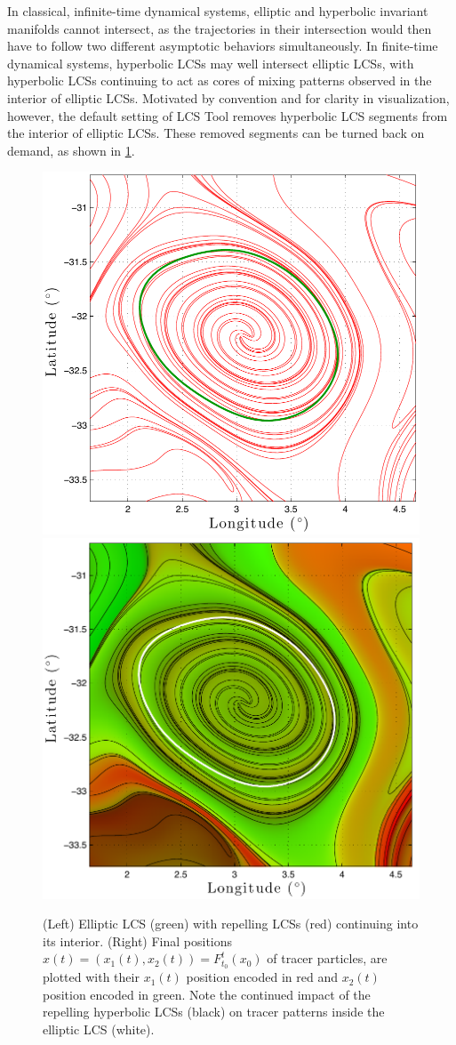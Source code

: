 \documentclass{elsarticle}
\begin{document}
In classical, infinite-time dynamical systems, elliptic and hyperbolic invariant manifolds cannot intersect, as the trajectories in their intersection would then have to follow two different asymptotic behaviors simultaneously. In finite-time dynamical systems, hyperbolic LCSs may well intersect elliptic LCSs, with hyperbolic LCSs continuing to act as cores of mixing patterns observed in the interior of elliptic LCSs. Motivated by convention and for clarity in visualization, however, the default setting of LCS Tool removes hyperbolic LCS segments from the interior of elliptic LCSs. These removed segments can be turned back on demand, as shown in \cref{fig:ocean_dataset_colortracer}.

\begin{figure}[hbt]
\centering
\includegraphics[width=.49\textwidth]{graphics/ocean_dataset/LCS_fwd_coherent_eddy}
\includegraphics[width=.49\textwidth]{graphics/ocean_dataset/LCS_fwd_colortracer}
\caption{(Left) Elliptic LCS (green) with repelling LCSs (red) continuing into its interior. (Right) Final positions $x(t) = (x_1(t),x_2(t)) = F_{t_0}^t(x_0)$ of tracer particles, are plotted with their $x_1(t)$ position encoded in red and $x_2(t)$ position encoded in green. Note the continued impact of the repelling hyperbolic LCSs (black) on tracer patterns inside the elliptic LCS (white).}
\label{fig:ocean_dataset_colortracer}
\end{figure}
\end{document}

